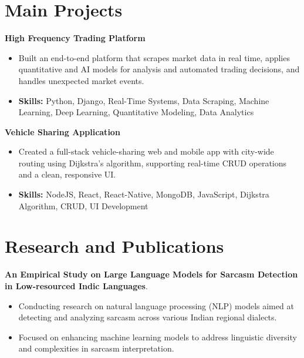 \documentclass[a4paper,11pt]{article}
\begin{document}
\section{\textbf{Main Projects}}

\vspace{1mm}
  \textbf{High Frequency Trading Platform  }
\vspace{-1.5mm} %
\begin{itemize}
  \item Built an end-to-end platform that scrapes market data in real time, applies quantitative and AI models for analysis and automated trading decisions, and handles unexpected market events.
\vspace{-3mm}
  \item \textbf{Skills:} Python, Django, Real-Time Systems, Data Scraping, Machine Learning, Deep Learning, Quantitative Modeling, Data Analytics
\end{itemize}


\vspace{1mm}
   \textbf{Vehicle Sharing Application }
\vspace{-1.5mm} %
\begin{itemize}
  \item Created a full-stack vehicle-sharing web and mobile app with city-wide routing using Dijkstra's algorithm, supporting real-time CRUD operations and a clean, responsive UI.
\vspace{-3mm}
  \item \textbf{Skills:} NodeJS, React, React-Native, MongoDB, JavaScript, Dijkstra Algorithm, CRUD, UI Development
\end{itemize}



\section{\textbf{Research and Publications} \hfill }
\vspace{1mm}
  \textbf{An Empirical Study on Large Language Models for Sarcasm Detection in Low-resourced Indic Languages}.
\vspace{-1mm} %
\begin{itemize}
  \item Conducting research on natural language processing (NLP) models aimed at detecting and analyzing sarcasm across various Indian regional dialects.
\vspace{-3mm}
  \item Focused on enhancing machine learning models to address linguistic diversity and complexities in sarcasm interpretation.
\end{itemize}
\end{document}
